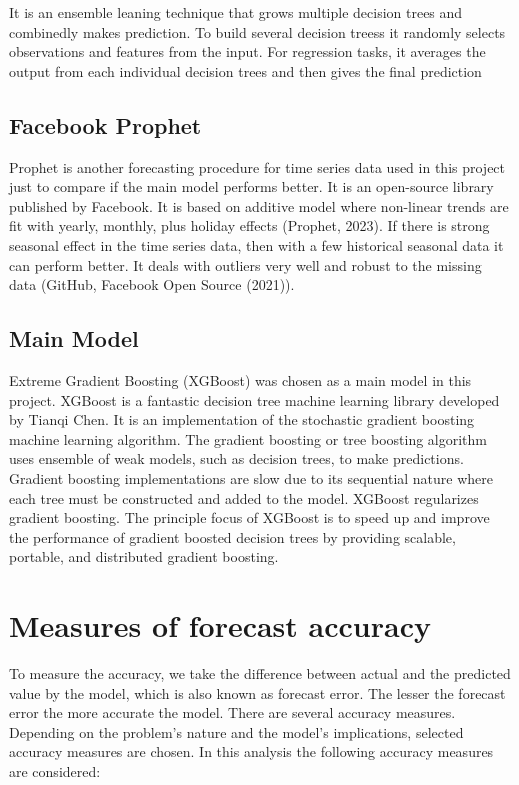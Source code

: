\documentclass[mstat,12pt]{unswthesis}
\begin{document}
It is an ensemble leaning technique that grows multiple decision trees
and combinedly makes prediction. To build several decision treess it
randomly selects observations and features from the input. For
regression tasks, it averages the output from each individual decision
trees and then gives the final prediction

\hypertarget{facebook-prophet}{%
\subsection{Facebook Prophet}\label{facebook-prophet}}

Prophet is another forecasting procedure for time series data used in
this project just to compare if the main model performs better. It is an
open-source library published by Facebook. It is based on additive model
where non-linear trends are fit with yearly, monthly, plus holiday
effects (Prophet, 2023). If there is strong seasonal effect in the time
series data, then with a few historical seasonal data it can perform
better. It deals with outliers very well and robust to the missing data
(GitHub, Facebook Open Source (2021)).

\hypertarget{main-model}{%
\subsection{Main Model}\label{main-model}}

Extreme Gradient Boosting (XGBoost) was chosen as a main model in this
project. XGBoost is a fantastic decision tree machine learning library
developed by Tianqi Chen. It is an implementation of the stochastic
gradient boosting machine learning algorithm. The gradient boosting or
tree boosting algorithm uses ensemble of weak models, such as decision
trees, to make predictions. Gradient boosting implementations are slow
due to its sequential nature where each tree must be constructed and
added to the model. XGBoost regularizes gradient boosting. The principle
focus of XGBoost is to speed up and improve the performance of gradient
boosted decision trees by providing scalable, portable, and distributed
gradient boosting.

\hypertarget{measures-of-forecast-accuracy}{%
\section{Measures of forecast
accuracy}\label{measures-of-forecast-accuracy}}

To measure the accuracy, we take the difference between actual and the
predicted value by the model, which is also known as forecast error. The
lesser the forecast error the more accurate the model. There are several
accuracy measures. Depending on the problem's nature and the model's
implications, selected accuracy measures are chosen. In this analysis
the following accuracy measures are considered:
\end{document}
